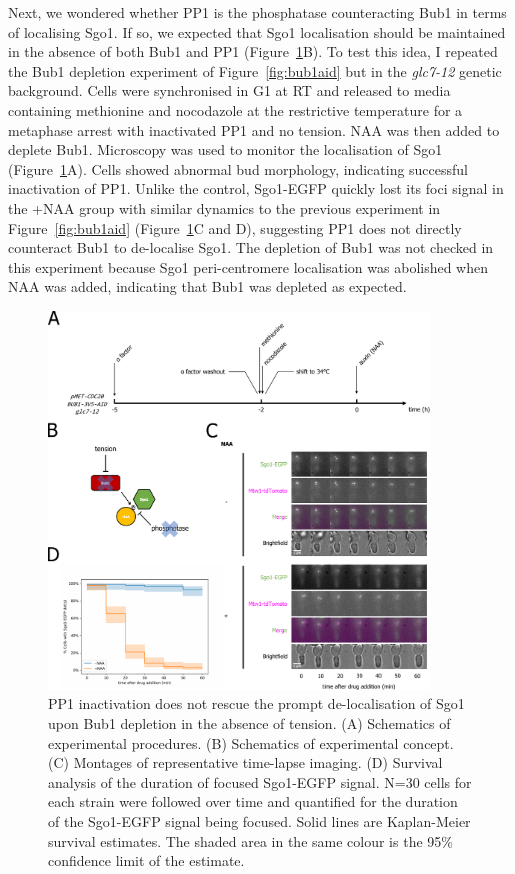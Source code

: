 Next, we wondered whether PP1 is the phosphatase counteracting Bub1 in terms of localising Sgo1. If so, we expected that Sgo1 localisation should be maintained in the absence of both Bub1 and PP1 (Figure~\ref{fig:bub1aidglc712}B). To test this idea, I repeated the 
Bub1 depletion experiment of Figure~\ref{fig:bub1aid} but in the \textit{glc7-12} genetic background. Cells were synchronised in G1 at RT and released to media containing methionine and nocodazole at the restrictive temperature for a metaphase arrest with inactivated PP1 and no tension. NAA was then added to deplete Bub1. Microscopy was used to monitor the localisation of Sgo1 (Figure~\ref{fig:bub1aidglc712}A). Cells showed abnormal bud morphology, indicating successful inactivation of PP1. Unlike the control, Sgo1-EGFP quickly lost its foci signal in the +NAA group with similar dynamics to the previous experiment in Figure~\ref{fig:bub1aid} (Figure~\ref{fig:bub1aidglc712}C and D), suggesting PP1 does not directly counteract Bub1 to de-localise Sgo1. The depletion of Bub1 was not checked in this experiment because Sgo1 peri-centromere localisation was abolished when NAA was added, indicating that Bub1 was depleted as expected. 

\begin{figure}[htbp]
  \centering
  \includegraphics[width=0.9\textwidth]{chapter3/figures/Bub1-AID glc7-12.pdf}
  \caption[PP1 inactivation does not rescue the prompt de-localisation of Sgo1 upon Bub1 depletion in the absence of tension.]{PP1 inactivation does not rescue the prompt de-localisation of Sgo1 upon Bub1 depletion in the absence of tension. (A) Schematics of experimental procedures. (B) Schematics of experimental concept. (C) Montages of representative time-lapse imaging. (D) Survival analysis of the duration of focused Sgo1-EGFP signal. N=30 cells for each strain were followed over time and quantified for the duration of the Sgo1-EGFP signal being focused. Solid lines are Kaplan-Meier survival estimates. The shaded area in the same colour is the 95\% confidence limit of the estimate.}
  \label{fig:bub1aidglc712}
\end{figure}

